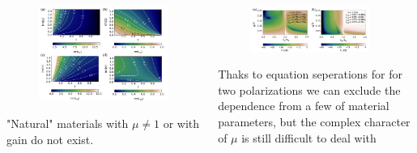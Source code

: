 \documentclass{beamer}
\begin{document}
\begin{frame} [t]
	\begin{columns}
		\begin{column}{0.5\textwidth}
			\begin{figure}[htb]
						\includegraphics[width=\textwidth]{../images/pml/oqe_materials.png}
			\end{figure}
			"Natural" materials with  $\mu \ne 1$ or with gain  do not exist.
		\end{column}
		\begin{column}{0.6\textwidth}
			\begin{figure}[htb]
						\includegraphics[width=0.9\textwidth]{../images/pml/oqe_reflection_kat.png}\\
			\end{figure}
				
		{\tiny Thaks to equation seperations for for two polarizations we can exclude the dependence from a few of material parameters, but the complex character of $\mu$ is still difficult to deal with}	


\end{column}
\end{columns}
\end{frame}
\end{document}
